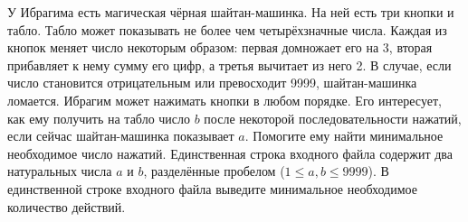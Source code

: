 У Ибрагима есть магическая чёрная шайтан-машинка. На ней есть три кнопки и табло. Табло может показывать не более чем четырёхзначные числа. Каждая из кнопок меняет число некоторым образом: первая домножает его на 3, вторая прибавляет к нему сумму его цифр, а третья вычитает из него 2. В случае, если число становится отрицательным или превосходит 9999, шайтан-машинка ломается. Ибрагим может нажимать кнопки в любом порядке. Его интересует, как ему получить на табло число $b$ после некоторой последовательности нажатий, если сейчас шайтан-машинка показывает $a$. Помогите ему найти минимальное необходимое число нажатий.
\InputFile
Единственная строка входного файла содержит два натуральных числа $a$ и $b$, разделённые пробелом ($1 \leq a, b \leq 9999$).
\OutputFile
В единственной строке входного файла выведите минимальное необходимое количество действий.

